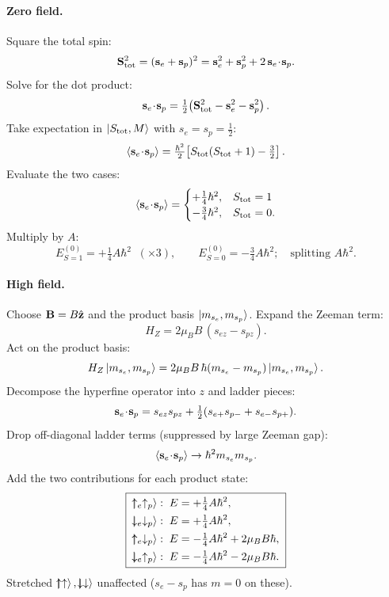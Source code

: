\documentclass[11pt]{article}
\begin{document}
\paragraph{Zero field.} Square the total spin:
\[
\vb S_{\rm tot}^2 = (\vb s_e+\vb s_p)^2 = \vb s_e^2 + \vb s_p^2 + 2\,\vb s_e\!\cdot\!\vb s_p.
\]
Solve for the dot product:
\[
\vb s_e\!\cdot\!\vb s_p = \tfrac12\!\left(\vb S_{\rm tot}^2 - \vb s_e^2 - \vb s_p^2\right).
\]
Take expectation in $\ket{S_{\rm tot},M}$ with $s_e=s_p=\tfrac12$:
\[
\langle\vb s_e\!\cdot\!\vb s_p\rangle = \tfrac{\hbar^2}{2}\!\left[S_{\rm tot}(S_{\rm tot}+1) - \tfrac32\right].
\]
Evaluate the two cases:
\[
\langle\vb s_e\!\cdot\!\vb s_p\rangle = \begin{cases}+\tfrac14\hbar^2,& S_{\rm tot}=1\\ -\tfrac34\hbar^2,& S_{\rm tot}=0.\end{cases}
\]
Multiply by $A$:
\begin{equation}
\boxed{\;E^{(0)}_{S=1} = +\tfrac14 A\hbar^{2}\;\;(\times 3),\qquad E^{(0)}_{S=0} = -\tfrac34 A\hbar^{2};\quad \text{splitting } A\hbar^2.\;}
\label{eq:zerofield}
\end{equation}

\paragraph{High field.} Choose $\vb B = B\hat{\vb z}$ and the product basis $\ket{m_{s_e},m_{s_p}}$. Expand the Zeeman term:
\[
H_Z = 2\mu_B B\,(s_{ez}-s_{pz}).
\]
Act on the product basis:
\[
H_Z\ket{m_{s_e},m_{s_p}} = 2\mu_B B\,\hbar(m_{s_e}-m_{s_p})\ket{m_{s_e},m_{s_p}}.
\]
Decompose the hyperfine operator into $z$ and ladder pieces:
\[
\vb s_e\!\cdot\!\vb s_p = s_{ez}s_{pz} + \tfrac12(s_{e+}s_{p-}+s_{e-}s_{p+}).
\]
Drop off-diagonal ladder terms (suppressed by large Zeeman gap):
\[
\langle\vb s_e\!\cdot\!\vb s_p\rangle \to \hbar^2 m_{s_e}m_{s_p}.
\]
Add the two contributions for each product state:
\begin{equation}
\boxed{\;\begin{aligned}
\ket{\!\!\uparrow_e\uparrow_p}: &\;\; E = +\tfrac14 A\hbar^{2},\\
\ket{\!\!\downarrow_e\downarrow_p}: &\;\; E = +\tfrac14 A\hbar^{2},\\
\ket{\!\!\uparrow_e\downarrow_p}: &\;\; E = -\tfrac14 A\hbar^{2}+2\mu_B B\hbar,\\
\ket{\!\!\downarrow_e\uparrow_p}: &\;\; E = -\tfrac14 A\hbar^{2}-2\mu_B B\hbar.
\end{aligned}\;}
\label{eq:highfield}
\end{equation}
Stretched $\ket{\!\!\uparrow\uparrow},\ket{\!\!\downarrow\downarrow}$ unaffected ($s_e-s_p$ has $m=0$ on these).
\end{document}
